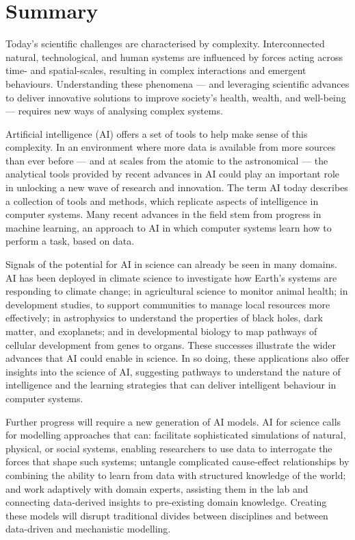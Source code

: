 \section*{Summary}

Today's scientific challenges are characterised by complexity.
Interconnected natural, technological, and human systems are influenced
by forces acting across time- and spatial-scales, resulting in complex
interactions and emergent behaviours. Understanding these phenomena ---
and leveraging scientific advances to deliver innovative solutions to
improve society's health, wealth, and well-being --- requires new ways of
analysing complex systems.


Artificial intelligence (AI) offers a set of tools to help make sense of
this complexity. In an environment where more data is available from
more sources than ever before --- and at scales from the atomic to the
astronomical --- the analytical tools provided by recent advances in AI
could play an important role in unlocking a new wave of research and
innovation. The term AI today describes a collection of tools and
methods, which replicate aspects of intelligence in computer systems.
Many recent advances in the field stem from progress in machine
learning, an approach to AI in which computer systems learn how to
perform a task, based on data.

Signals of the potential for AI in science can already be seen in many
domains. AI has been deployed in climate science to investigate how
Earth's systems are responding to climate change; in agricultural
science to monitor animal health; in development studies, to support
communities to manage local resources more effectively; in astrophysics
to understand the properties of black holes, dark matter, and
exoplanets; and in developmental biology to map pathways of cellular
development from genes to organs. These successes illustrate the wider
advances that AI could enable in science. In so doing, these
applications also offer insights into the science of AI, suggesting
pathways to understand the nature of intelligence and the learning
strategies that can deliver intelligent behaviour in computer systems.

Further progress will require a new generation of AI models. AI for
science calls for modelling approaches that can: facilitate
sophisticated simulations of natural, physical, or social systems,
enabling researchers to use data to interrogate the forces that shape
such systems; untangle complicated cause-effect relationships by
combining the ability to learn from data with structured knowledge of
the world; and work adaptively with domain experts, assisting them in
the lab and connecting data-derived insights to pre-existing domain
knowledge. Creating these models will disrupt traditional divides
between disciplines and between data-driven and mechanistic modelling.

